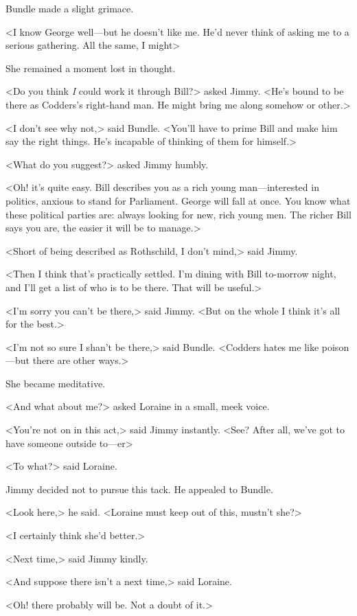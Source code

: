Bundle made a slight grimace.

<I know George well—but he doesn't like me. He'd never think of asking me to a serious gathering. All the same, I might\longdash>

She remained a moment lost in thought.

<Do you think \emph{I} could work it through Bill?> asked Jimmy. <He's bound to be there as Codders's right-hand man. He might bring me along somehow or other.>

<I don't see why not,> said Bundle. <You'll have to prime Bill and make him say the right things. He's incapable of thinking of them for himself.>

<What do you suggest?> asked Jimmy humbly.

<Oh! it's quite easy. Bill describes you as a rich young man—interested in politics, anxious to stand for Parliament. George will fall at once. You know what these political parties are: always looking for new, rich young men. The richer Bill says you are, the easier it will be to manage.>

<Short of being described as Rothschild, I don't mind,> said Jimmy.

<Then I think that's practically settled. I'm dining with Bill to-morrow night, and I'll get a list of who is to be there. That will be useful.>

<I'm sorry you can't be there,> said Jimmy. <But on the whole I think it's all for the best.>

<I'm not so sure I shan't be there,> said Bundle. <Codders hates me like poison—but there are other ways.>

She became meditative.

<And what about me?> asked Loraine in a small, meek voice.

<You're not on in this act,> said Jimmy instantly. <See? After all, we've got to have someone outside to—er\longdash>

<To what?> said Loraine.

Jimmy decided not to pursue this tack. He appealed to Bundle.

<Look here,> he said. <Loraine must keep out of this, mustn't she?>

<I certainly think she'd better.>

<Next time,> said Jimmy kindly.

<And suppose there isn't a next time,> said Loraine.

<Oh! there probably will be. Not a doubt of it.>


